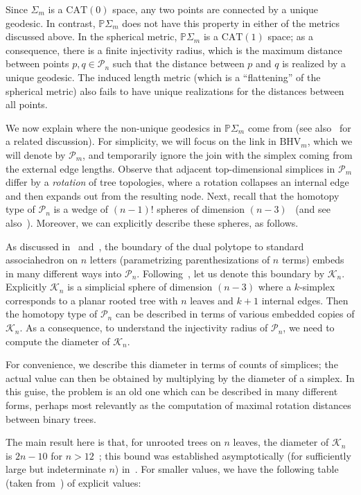 \documentclass[a4paper,11pt]{article}
\newcommand{\CAT}{\textrm{CAT}}
\newcommand{\BHV}{\textrm{BHV}}
\newcommand{\aK}{\mathcal{K}}
\newcommand{\aP}{\mathcal{P}}
\begin{document}
Since $\Sigma_m$ is a $\CAT(0)$ space, any two points are connected by a unique geodesic.
In contrast, $\mathbb{P}\Sigma_m$ does not have this property in either of the metrics discussed above.
In the spherical metric, $\mathbb{P}\Sigma_m$ is a $\CAT(1)$ space; as a consequence, there is a finite injectivity radius, which is the maximum distance between points $p,q \in \aP_n$ such that the distance between $p$ and $q$ is realized by a unique geodesic.
The induced length metric (which is a ``flattening'' of the spherical metric) also fails to have unique realizations for the distances between all points.

We now explain where the non-unique geodesics in $\mathbb{P}\Sigma_m$ come from (see also~\cite[3.3]{billera2001geometry} for a related discussion).
For simplicity, we will focus on the link in $\BHV_m$, which we will denote by $\aP_m$, and temporarily ignore the join with the simplex coming from the external edge lengths.
Observe that adjacent top-dimensional simplices in $\aP_m$ differ by a {\em rotation} of tree topologies, where a rotation collapses an internal edge and then expands out from the resulting node.
Next, recall that the homotopy type of $\aP_n$ is a wedge of $(n-1)!$ spheres of dimension $(n-3)$~\cite{robinson1996tree} (and see also~\cite[Thm. 6]{devadoss2014polyhedral}).
Moreover, we can explicitly describe these spheres, as follows.

As discussed in~\cite[Prop. 1]{devadoss2014polyhedral} and~\cite[\S 3.1]{billera2001geometry}, the boundary of the dual polytope to standard associahedron on $n$ letters (parametrizing parenthesizations of $n$ terms) embeds in many different ways into $\aP_n$.
Following~\cite{devadoss2014polyhedral}, let us denote this boundary by $\aK_n$.
Explicitly $\aK_n$ is a simplicial sphere of dimension $(n-3)$ where a $k$-simplex corresponds to a planar rooted tree with $n$ leaves and $k+1$ internal edges.
Then the homotopy type of $\aP_n$ can be described in terms of various embedded copies of $\aK_n$.
As a consequence, to understand the injectivity radius of $\aP_n$, we need to compute the diameter of $\aK_n$.

For convenience, we describe this diameter in terms of counts of simplices; the actual value can then be obtained by multiplying by the diameter of a simplex.
In this guise, the problem is an old one which can be described in many different forms, perhaps most relevantly as the computation of maximal rotation distances between binary trees.

The main result here is that, for unrooted trees on $n$ leaves, the diameter of $\aK_n$ is $2n - 10$ for $n > 12$~\cite{pournin2014diameter}; this bound was established asymptotically (for sufficiently large but indeterminate $n$) in~\cite{sleator1988rotation}.
For smaller values, we have the following table (taken from~\cite[\S2.3]{sleator1988rotation}) of explicit values:
\end{document}
